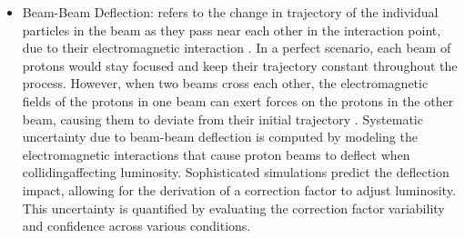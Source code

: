 \begin{itemize}
\item Beam-Beam Deflection: refers to the change in trajectory of the individual particles in the beam as they pass near each other in the interaction point, due to their electromagnetic interaction \cite{Herr:1982430}. In a perfect scenario, each beam of protons would stay focused and keep their trajectory constant throughout the process. However, when two beams cross each other, the electromagnetic fields of the protons in one beam can exert forces on the protons in the other beam, causing them to deviate from their initial trajectory \cite{babaev2023impact}. Systematic uncertainty due to beam-beam deflection is computed by modeling the electromagnetic interactions that cause proton beams to deflect when collidingaffecting luminosity. Sophisticated simulations predict the deflection impact, allowing for the derivation of a correction factor to adjust luminosity. This uncertainty is quantified by evaluating the correction factor variability and confidence across various conditions.



\end{itemize}
